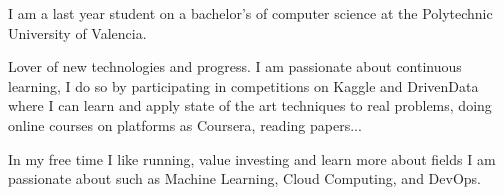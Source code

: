\vspace{3mm}

\begin{cvparagraph}
I am a last year student on a bachelor's of computer science at the Polytechnic University of Valencia.

Lover of new technologies and progress. I am passionate about continuous learning, I do so by participating in competitions on Kaggle and DrivenData where I can learn and apply state of the art techniques to real problems, doing online courses on platforms as Coursera, reading papers...

In my free time I like running, value investing and learn more about fields I am passionate about such as Machine Learning, Cloud Computing, and DevOps.
\end{cvparagraph}
